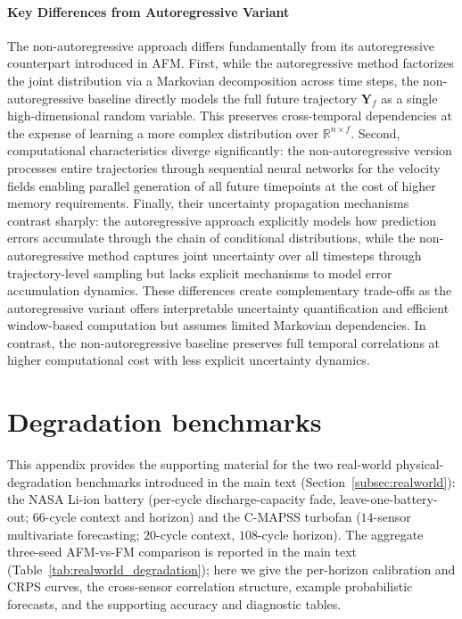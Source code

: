 \documentclass[preprint,12pt,authoryear]{elsarticle}
\newcommand{\oldrev}[1]{#1}
\begin{document}
\paragraph{Key Differences from Autoregressive Variant} The non-autoregressive approach differs fundamentally from its autoregressive counterpart introduced in AFM. First, while the autoregressive method factorizes the joint distribution via a Markovian decomposition across time steps, the non-autoregressive baseline directly models the full future trajectory $\mathbf{Y}_f$
as a single high-dimensional random variable. This preserves cross-temporal dependencies at the expense of learning a more complex distribution over $\mathbb{R}^{n \times f}$. 
Second, computational characteristics diverge significantly: the non-autoregressive version processes entire trajectories through sequential neural networks for the velocity fields enabling parallel generation of all future timepoints at the cost of higher memory requirements. Finally, their uncertainty propagation mechanisms contrast sharply: the autoregressive approach explicitly models how prediction errors accumulate through the chain of conditional distributions, while the non-autoregressive method captures joint uncertainty over all timesteps through trajectory-level sampling but lacks explicit mechanisms to model error accumulation dynamics. These differences create complementary trade-offs as the autoregressive variant offers interpretable uncertainty quantification and efficient window-based computation but assumes limited Markovian dependencies. In contrast, the non-autoregressive baseline preserves full temporal correlations at higher computational cost with less explicit uncertainty dynamics.







\section{\oldrev{Degradation benchmarks}}\label{app:degradation}

{
This appendix provides the supporting material for the two real-world physical-degradation benchmarks introduced in the main text (Section~\ref{subsec:realworld}): the NASA Li-ion battery (per-cycle discharge-capacity fade, leave-one-battery-out; $66$-cycle context and horizon) and the C-MAPSS turbofan ($14$-sensor multivariate forecasting; $20$-cycle context, $108$-cycle horizon). The aggregate three-seed AFM-vs-FM comparison is reported in the main text (Table~\ref{tab:realworld_degradation}); here we give the per-horizon calibration and CRPS curves, the cross-sensor correlation structure, example probabilistic forecasts, and the supporting accuracy and diagnostic tables.
}
\end{document}
